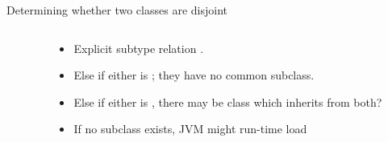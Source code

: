 \begin{frame}{Determining whether two classes are disjoint}
  \begin{columns}[T]
    \begin{column}{0.45\textwidth}
      \usebox\classbox  
    \end{column}%
    \begin{column}{0.55\textwidth}

      \bigskip
      
      \begin{itemize}
      \item<1->{Explicit subtype relation .}%
      \item<2->{Else if either is ; they have no common  subclass.}%
      \item<3->{Else if either is , there may be class which inherits from both?}%
      \item<4>{If  no subclass exists, JVM might  run-time
      load  }%
      \end{itemize}
    \end{column}%
  \end{columns}
\end{frame}

